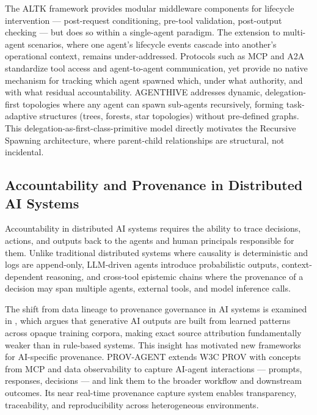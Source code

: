 The ALTK framework \cite{altk} provides modular middleware components for lifecycle intervention — post-request conditioning, pre-tool validation, post-output checking — but does so within a single-agent paradigm. The extension to multi-agent scenarios, where one agent's lifecycle events cascade into another's operational context, remains under-addressed. Protocols such as MCP \cite{mcp} and A2A \cite{a2a} standardize tool access and agent-to-agent communication, yet provide no native mechanism for tracking which agent spawned which, under what authority, and with what residual accountability. AGENTHIVE \cite{agenthive} addresses dynamic, delegation-first topologies where any agent can spawn sub-agents recursively, forming task-adaptive structures (trees, forests, star topologies) without pre-defined graphs. This delegation-as-first-class-primitive model directly motivates the Recursive Spawning architecture, where parent-child relationships are structural, not incidental.

\subsection{Accountability and Provenance in Distributed AI Systems}

Accountability in distributed AI systems requires the ability to trace decisions, actions, and outputs back to the agents and human principals responsible for them. Unlike traditional distributed systems where causality is deterministic and logs are append-only, LLM-driven agents introduce probabilistic outputs, context-dependent reasoning, and cross-tool epistemic chains where the provenance of a decision may span multiple agents, external tools, and model inference calls.

The shift from data lineage to provenance governance in AI systems is examined in \cite{forbesprov}, which argues that generative AI outputs are built from learned patterns across opaque training corpora, making exact source attribution fundamentally weaker than in rule-based systems. This insight has motivated new frameworks for AI-specific provenance. PROV-AGENT \cite{provegent} extends W3C PROV with concepts from MCP and data observability to capture AI-agent interactions — prompts, responses, decisions — and link them to the broader workflow and downstream outcomes. Its near real-time provenance capture system enables transparency, traceability, and reproducibility across heterogeneous environments.

